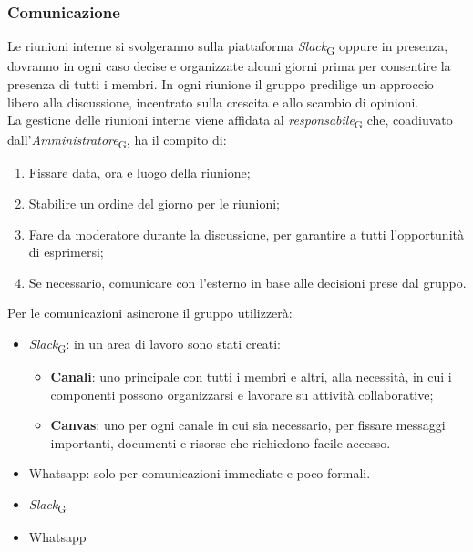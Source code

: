 \subsubsection{Comunicazione}
Le riunioni interne si svolgeranno sulla piattaforma \textit{Slack}\textsubscript{G} oppure in presenza, dovranno in ogni caso decise e organizzate alcuni giorni prima per consentire la presenza di tutti i membri. In ogni riunione il gruppo predilige un approccio libero alla discussione, incentrato sulla crescita e allo scambio di opinioni. \\
La gestione delle riunioni interne viene affidata al \textit{responsabile}\textsubscript{G} che, coadiuvato dall'\textit{Amministratore}\textsubscript{G}, ha il compito di:
\begin{enumerate}
    \item Fissare data, ora e luogo della riunione;
    \item Stabilire un ordine del giorno per le riunioni;
    \item Fare da moderatore durante la discussione, per garantire a tutti l'opportunità di esprimersi;
    \item Se necessario, comunicare con l'esterno in base alle decisioni prese dal gruppo.
\end{enumerate}
Per le comunicazioni asincrone il gruppo utilizzerà:
\begin{itemize}
    \item \textit{Slack}\textsubscript{G}: in un area di lavoro sono stati creati:
            \begin{itemize}
                \item \textbf{Canali}: uno principale con tutti i membri e altri, alla necessità, in cui i componenti possono organizzarsi e lavorare su attività collaborative;
                \item \textbf{Canvas}: uno per ogni canale in cui sia necessario, per fissare messaggi importanti, documenti e risorse che richiedono facile accesso.
            \end{itemize}
    \item Whatsapp: solo per comunicazioni immediate e poco formali.
\end{itemize}
\begin{itemize}
    \item \textit{Slack}\textsubscript{G}
    \item Whatsapp
\end{itemize}


